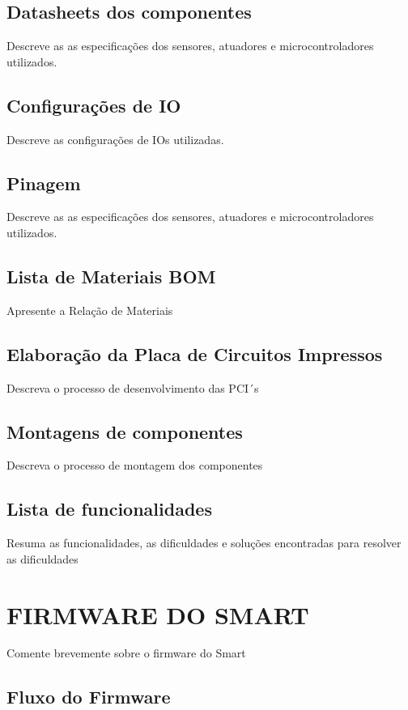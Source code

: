\subsection{Datasheets dos componentes}
Descreve as as especificações dos sensores, atuadores  e microcontroladores utilizados.
\subsection{Configurações de IO}
Descreve as configurações de IOs utilizadas.

\subsection{Pinagem}
Descreve as as especificações dos sensores, atuadores  e microcontroladores utilizados.

\subsection{Lista de Materiais BOM}

Apresente a Relação de Materiais

\subsection{Elaboração da Placa de Circuitos Impressos}

Descreva o processo de desenvolvimento das PCI´s

\subsection{Montagens de componentes}

Descreva o processo de montagem dos componentes

\subsection{Lista de funcionalidades}

Resuma as funcionalidades, as dificuldades e soluções encontradas para resolver as dificuldades

\section{FIRMWARE DO SMART}

Comente brevemente sobre o firmware do Smart

\subsection{Fluxo do Firmware}

